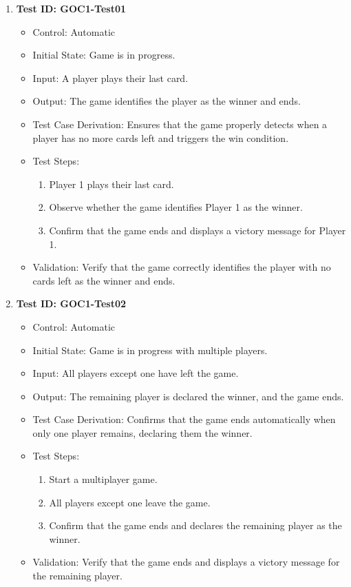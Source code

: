 \documentclass[12pt, titlepage]{article}
\begin{document}
\begin{enumerate}
    \item \textbf{Test ID: GOC1-Test01}
        \begin{itemize}
            \item Control: Automatic
            \item Initial State: Game is in progress.
            \item Input: A player plays their last card.
            \item Output: The game identifies the player as the winner and ends.
            \item Test Case Derivation: Ensures that the game properly detects when a player has no more cards left and triggers the win condition.
            \item Test Steps:
                \begin{enumerate}
                    \item Player 1 plays their last card.
                    \item Observe whether the game identifies Player 1 as the winner.
                    \item Confirm that the game ends and displays a victory message for Player 1.
                \end{enumerate}
            \item Validation: Verify that the game correctly identifies the player with no cards left as the winner and ends.
        \end{itemize}

    \item \textbf{Test ID: GOC1-Test02}
        \begin{itemize}
            \item Control: Automatic
            \item Initial State: Game is in progress with multiple players.
            \item Input: All players except one have left the game.
            \item Output: The remaining player is declared the winner, and the game ends.
            \item Test Case Derivation: Confirms that the game ends automatically when only one player remains, declaring them the winner.
            \item Test Steps:
                \begin{enumerate}
                    \item Start a multiplayer game.
                    \item All players except one leave the game.
                    \item Confirm that the game ends and declares the remaining player as the winner.
                \end{enumerate}
            \item Validation: Verify that the game ends and displays a victory message for the remaining player.
        \end{itemize}
\end{enumerate}
\end{document}
